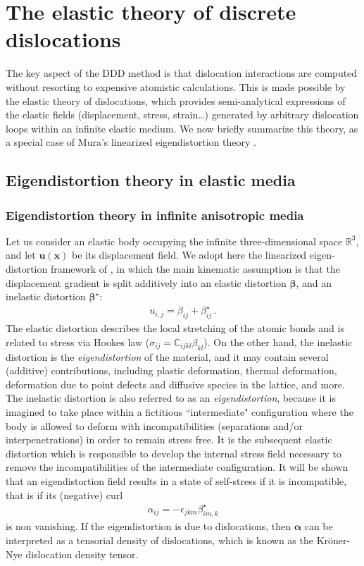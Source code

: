 \newpage
\chapter{The elastic theory of discrete dislocations\label{elasticTheoryDislocations}}


The key aspect of the DDD method is that dislocation interactions are computed without resorting to expensive atomistic calculations. This is made possible by the 
elastic theory of dislocations, which provides semi-analytical expressions of the elastic fields (displacement, stress, strain\ldots) generated by  arbitrary dislocation loops within an infinite elastic medium. We now briefly summarize this theory,  as a special case of Mura's linearized eigendistortion theory \citep{Mura:1987wt}. 

\section{Eigendistortion theory in elastic media}
\subsection{Eigendistortion theory in infinite anisotropic media\label{eigendist_classical}}
Let us consider an elastic body occupying the infinite three-dimensional space $\mathbb{R}^3$, and let $\bm u(\bm x)$ be its displacement field. We adopt here the linearized eigen-distortion framework of \cite{Mura:1987wt}, in which the main kinematic assumption  is that the displacement gradient is split additively into an elastic distortion $\bm \beta$, and an inelastic distortion $\bm \beta^\star$:
\begin{align}
u_{i,j}=\beta_{ij}+\beta^\star_{ij}\, .
\label{linear_decomposition}
\end{align}
The elastic distortion describes the local stretching of the atomic bonds and is related to stress via Hookes law ($\sigma_{ij}=\mathbb{C}_{ijkl}\beta_{kl}$). On the other hand, the inelastic distortion is the \textit{eigendistortion} of  the material, and it may contain several (additive) contributions, including plastic deformation, thermal deformation, deformation due to point defects and diffusive species in the lattice, and more. The inelastic distortion is also referred to as an \textit{eigendistortion}, because it is imagined to take place within a fictitious ``intermediate" configuration where the body is allowed to deform with incompatibilities (separations and/or interpenetrations) in order  to remain stress free. It is the subsequent elastic distortion which is responsible to develop the internal stress field necessary to remove the incompatibilities of the intermediate configuration. It will be shown that an eigendistortion field results in a state of self-stress if it is incompatible, that is if its (negative) curl 
\begin{align}
\alpha_{ij}=-\epsilon_{jkm}\beta^\star_{im,k}
\label{alpha}
\end{align}
is non vanishing. If the eigendistortion is due to dislocations, then $\bm \alpha$ can be interpreted as a tensorial density of dislocations, which  is  known as the Kr\"oner-Nye dislocation density tensor.


